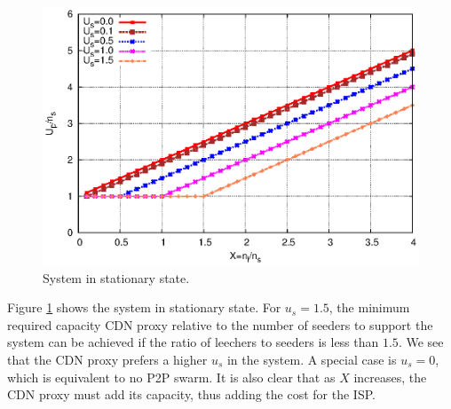 \documentclass[paper]{ieice}
\begin{document}
\begin{figure}[hb] 
\begin{center}
\includegraphics[scale=0.65]{graphs/stable-steady-state.eps}
\end{center}
\caption{System in stationary state.}
\label{fig:steadystate}
\vspace{-2mm}
\end{figure}

Figure \ref{fig:steadystate} shows the system in stationary state.
For $u_s=1.5$, the minimum required capacity CDN proxy relative to the number of seeders to support the system can be achieved if the ratio of leechers to seeders is less than $1.5$.
We see that the CDN proxy prefers a higher $u_s$ in the system.
A special case is $u_s = 0$, which is equivalent to no P2P swarm.
It is also clear that as $X$ increases, the CDN proxy must add its capacity, thus adding the cost for the ISP.
\end{document}
